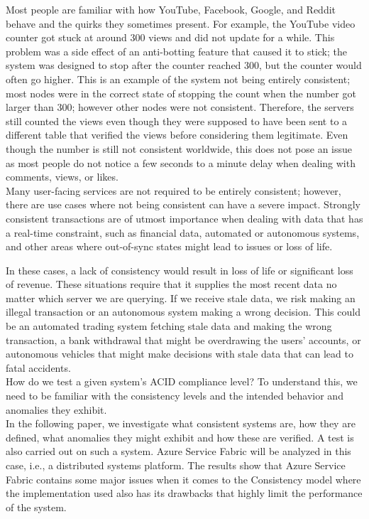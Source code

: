 \documentclass[a4paper,10pt,titlepage]{report}
\begin{document}
    Most people are familiar with how YouTube, Facebook, Google, and Reddit behave and the quirks they sometimes present.
    For example, the YouTube video counter got stuck at around 300 views and did not update for a while. This problem was a side effect of an anti-botting feature that caused it to stick; the system was designed to stop after the counter reached 300, but the counter would often go higher. This is an example of the system not being entirely consistent; most nodes were in the correct state of stopping the count when the number got larger than 300; however other nodes were not consistent. Therefore, the servers still counted the views even though they were supposed to have been sent to a different table that verified the views before considering them legitimate. Even though the number is still not consistent worldwide, this does not pose an issue as most people do not notice a few seconds to a minute delay when dealing with comments, views, or likes.
    \\
    Many user-facing services are not required to be entirely consistent; however, there are use cases where not being consistent can have a severe impact. Strongly consistent transactions are of utmost importance when dealing with data that has a real-time constraint, such as financial data, automated or autonomous systems, and other areas where out-of-sync states might lead to issues or loss of life.

    In these cases, a lack of consistency would result in loss of life or significant loss of revenue. These situations require that it supplies the most recent data no matter which server we are querying. If we receive stale data, we risk making an illegal transaction or an autonomous system making a wrong decision. This could be an automated trading system fetching stale data and making the wrong transaction, a bank withdrawal that might be overdrawing the users' accounts, or autonomous vehicles that might make decisions with stale data that can lead to fatal accidents. \\

    \vspace{5mm}
    How do we test a given system's ACID compliance level? To understand this, we need to be familiar with the consistency levels and the intended behavior and anomalies they exhibit.\\
    \vspace{5mm}
    In the following paper, we investigate what consistent systems are, how they are defined, what anomalies they might exhibit and how these are verified. A test is also carried out on such a system. Azure Service Fabric will be analyzed in this case, i.e., a distributed systems platform. The results show that Azure Service Fabric contains some major issues when it comes to the Consistency model where the implementation used also has its drawbacks that highly limit the performance of the system.\\
    \vspace{5mm}
    \newpage
\end{document}
